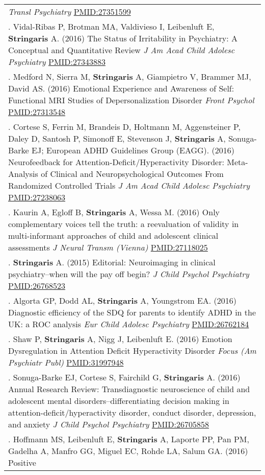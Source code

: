 \documentclass[
]{article}
\begin{document}
\begin{longtable}[]{@{}
  >{\raggedright\arraybackslash}p{}@{}}
\emph{Transl Psychiatry} \url{PMID:27351599} \\
123. Vidal-Ribas P, Brotman MA, Valdivieso I, Leibenluft E,
\textbf{Stringaris} A. (2016) The Status of Irritability in Psychiatry:
A Conceptual and Quantitative Review \emph{J Am Acad Child Adolesc
Psychiatry} \url{PMID:27343883} \\
124. Medford N, Sierra M, \textbf{Stringaris} A, Giampietro V, Brammer
MJ, David AS. (2016) Emotional Experience and Awareness of Self:
Functional MRI Studies of Depersonalization Disorder \emph{Front
Psychol} \url{PMID:27313548} \\
125. Cortese S, Ferrin M, Brandeis D, Holtmann M, Aggensteiner P, Daley
D, Santosh P, Simonoff E, Stevenson J, \textbf{Stringaris} A,
Sonuga-Barke EJ; European ADHD Guidelines Group (EAGG). (2016)
Neurofeedback for Attention-Deficit/Hyperactivity Disorder:
Meta-Analysis of Clinical and Neuropsychological Outcomes From
Randomized Controlled Trials \emph{J Am Acad Child Adolesc Psychiatry}
\url{PMID:27238063} \\
126. Kaurin A, Egloff B, \textbf{Stringaris} A, Wessa M. (2016) Only
complementary voices tell the truth: a reevaluation of validity in
multi-informant approaches of child and adolescent clinical assessments
\emph{J Neural Transm (Vienna)} \url{PMID:27118025} \\
127. \textbf{Stringaris} A. (2015) Editorial: Neuroimaging in clinical
psychiatry--when will the pay off begin? \emph{J Child Psychol
Psychiatry} \url{PMID:26768523} \\
128. Algorta GP, Dodd AL, \textbf{Stringaris} A, Youngstrom EA. (2016)
Diagnostic efficiency of the SDQ for parents to identify ADHD in the UK:
a ROC analysis \emph{Eur Child Adolesc Psychiatry}
\url{PMID:26762184} \\
129. Shaw P, \textbf{Stringaris} A, Nigg J, Leibenluft E. (2016) Emotion
Dysregulation in Attention Deficit Hyperactivity Disorder \emph{Focus
(Am Psychiatr Publ)} \url{PMID:31997948} \\
130. Sonuga-Barke EJ, Cortese S, Fairchild G, \textbf{Stringaris} A.
(2016) Annual Research Review: Transdiagnostic neuroscience of child and
adolescent mental disorders--differentiating decision making in
attention-deficit/hyperactivity disorder, conduct disorder, depression,
and anxiety \emph{J Child Psychol Psychiatry} \url{PMID:26705858} \\
131. Hoffmann MS, Leibenluft E, \textbf{Stringaris} A, Laporte PP, Pan
PM, Gadelha A, Manfro GG, Miguel EC, Rohde LA, Salum GA. (2016) Positive

\end{longtable}
\end{document}
